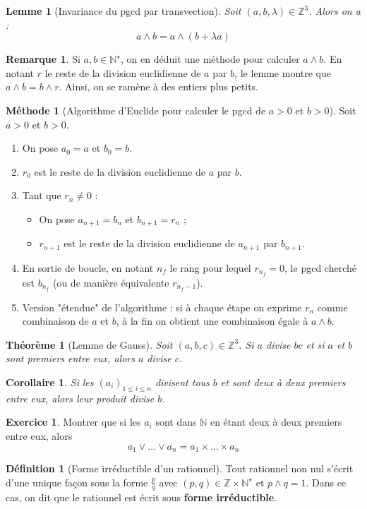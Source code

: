 \documentclass[french]{book}
\newcommand{\N}{\mathbb{N}}
\newcommand{\Z}{\mathbb{Z}}
\newcommand{\st}{^\star}
\theoremstyle{plain}
\newtheorem{thm}{Théorème}[chapter]
\newtheorem{lem}{Lemme}[chapter]
\newtheorem{cor}{Corollaire}[chapter]
\theoremstyle{definition}
\newtheorem{dfn}{Définition}[chapter]
\newtheorem{rmq}{Remarque}[chapter]
\newtheorem{met}{Méthode}[chapter]
\newtheorem{exe}{Exercice}[chapter]
\theoremstyle{remark}
\begin{document}
\begin{lem}[Invariance du pgcd par transvection]
	Soit $(a,b,\lambda)\in\Z^3$. Alors on a : $$a\wedge b=a\wedge (b+\lambda a)$$
\end{lem}
\begin{rmq}
	Si $a,b\in\N\st$, on en déduit une méthode pour calculer $a\wedge b$. En notant $r$ le reste de la division euclidienne de $a$ par $b$, le lemme montre que $a\wedge b=b\wedge r$. Ainsi, on se ramène à des entiers plus petits.
\end{rmq}
\begin{met}[Algorithme d'Euclide pour calculer le pgcd de $a>0$ et $b>0$]
	Soit $a>0$ et $b>0$. \begin{enumerate}
		\item On pose $a_0=a$ et $b_0=b$.
		\item $r_0$ est le reste de la division euclidienne de $a$ par $b$.
		\item Tant que $r_n\ne0$ : \begin{itemize}
			\item On pose $a_{n+1}=b_n$ et $b_{n+1}=r_n$ ;
			\item $r_{n+1}$ est le reste de la division euclidienne de $a_{n+1}$ par $b_{n+1}$.
		\end{itemize}
		\item En sortie de boucle, en notant $n_f$ le rang pour lequel $r_{n_f}=0$, le pgcd cherché est $b_{n_f}$ (ou de manière équivalente $r_{n_f-1}$).
		\item Version "étendue" de l'algorithme : si à chaque étape on exprime $r_n$ comme combinaison de $a$ et $b$, à la fin on obtient une combinaison égale à $a\wedge b$.
	\end{enumerate}
\end{met}
\begin{thm}[Lemme de Gauss]
	Soit $(a,b,c)\in\Z^3$. Si $a$ divise $bc$ et si $a$ et $b$ sont premiers entre eux, alors $a$ divise $c$.
\end{thm}
\begin{cor}
	Si les $(a_i)_{1\leqslant i\leqslant n}$ divisent tous $b$ et sont deux à deux premiers entre eux, alors leur produit divise $b$.
\end{cor}
\begin{exe}
	Montrer que si les $a_i$ sont dans $\N$ en étant deux à deux premiers entre eux, alors $$a_1\vee\ldots\vee a_n=a_1\times\ldots\times a_n$$
\end{exe}
\begin{dfn}[Forme irréductible d'un rationnel]
	Tout rationnel non nul s'écrit d'une unique façon sous la forme $\displaystyle\frac{p}{q}$ avec $(p,q)\in\Z\times\N\st$ et $p\wedge q=1$. Dans ce cas, on dit que le rationnel est écrit sous \textbf{forme irréductible}.
\end{dfn}
\end{document}
